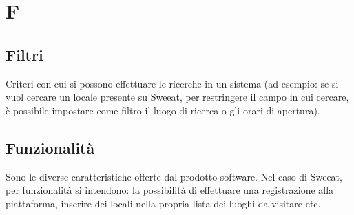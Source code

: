 \section{F}

\subsection{Filtri} Criteri con cui si possono effettuare le ricerche in un sistema (ad esempio: se si vuol cercare un locale presente su Sweeat, per restringere il campo in cui cercare, è possibile impostare come filtro il luogo di ricerca o gli orari di apertura).

\subsection{Funzionalità} Sono le diverse caratteristiche offerte dal prodotto software. Nel caso di Sweeat, per funzionalità si intendono: la possibilità di effettuare una registrazione alla piattaforma, inserire dei locali nella propria lista dei luoghi da visitare etc.

\clearpage
